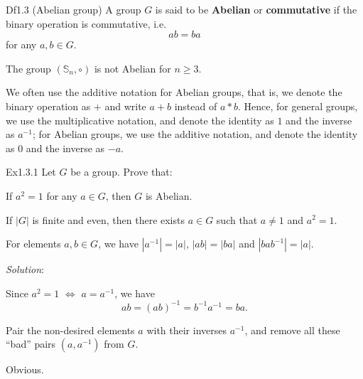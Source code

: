 \documentclass{article}
\begin{document}
\begin{Df}{Df1.3 (Abelian group)}
    A group $G$ is said to be \textbf{Abelian} or \textbf{commutative} if the binary operation is commutative, i.e. 
    $$ ab = ba $$
    for any $a, b\in G$.
\end{Df}

\begin{Rmk}{}
    \begin{compactenum}
        \item \textcolor{Th}{The group $(\mathbb{S}_n, \circ)$ is not Abelian for $n\geq 3$.}
        \item \textcolor{Df}{We often use the additive notation for Abelian groups, that is, we denote the binary operation as $+$ and write $a+b$ instead of $a\ast b$. Hence, for general groups, we use the multiplicative notation, and denote the identity as $1$ and the inverse as $a^{-1}$; for Abelian groups, we use the additive notation, and denote the identity as $0$ and the inverse as $-a$.}
    \end{compactenum}
\end{Rmk}

\begin{Th}{Ex1.3.1}
    Let $G$ be a group. Prove that:
    \begin{compactenum}
        \item If $a^2=1$ for any $a\in G$, then $G$ is Abelian.
        \item If $|G|$ is finite and even, then there exists $a\in G$ such that $a\neq 1$ and $a^2=1$.
        \item For elements $a, b\in G$, we have $|a^{-1}| = |a|$, $|ab| = |ba|$ and $|bab^{-1}| = |a|$.
    \end{compactenum}
    \tcblower
    \textit{Solution}:
    \begin{compactenum}
        \item Since $a^2=1$ $\Leftrightarrow$ $a=a^{-1}$, we have
        $$ ab = (ab)^{-1} = b^{-1}a^{-1} = ba. $$
        \item Pair the non-desired elements $a$ with their inverses $a^{-1}$, and remove all these ``bad'' pairs $(a, a^{-1})$ from $G$.
        \item Obvious. 
    \end{compactenum}
\end{Th}
\end{document}
